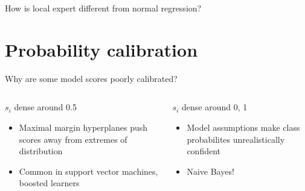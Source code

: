 \documentclass[ignorenonframetext,]{beamer}
\begin{document}
\begin{frame}{How is local expert different from normal regression?}

\end{frame}

\section{Probability calibration}\label{probability-calibration}

\begin{frame}{Why are some model scores poorly calibrated?}

\begin{columns}[t]
\begin{column}{0.48\textwidth}

\begin{block}{$s_i$ dense around 0.5}
\begin{itemize}
\item Maximal margin hyperplanes push scores away from extremes of distribution
\item Common in support vector machines, boosted learners
\end{itemize}
\end{block}

\end{column}


\begin{column}{0.48\textwidth}

\begin{block}{$s_i$ dense around 0, 1}
\begin{itemize}
\item Model assumptions make class probabilites unrealistically confident
\item Naive Bayes!
\end{itemize}
\end{block}
\end{column}
\end{columns}

\end{frame}
\end{document}
